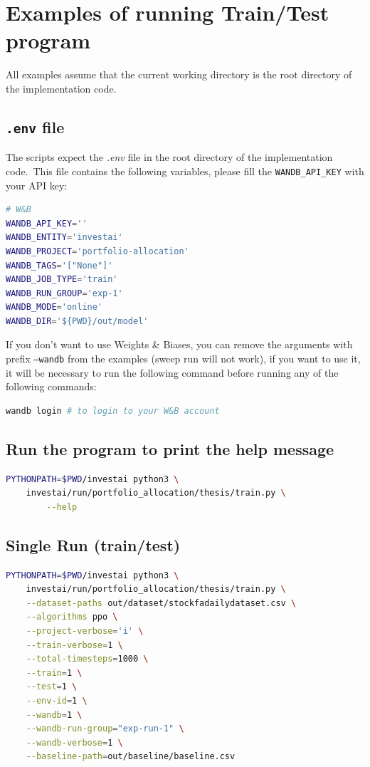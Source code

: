 \documentclass[../xlapes02]{subfiles}
\begin{document}
    \section{Examples of running Train/Test program}\label{sec:examples-of-running-train/test-program}
    All examples assume that the current working directory is the root directory of the implementation code.

    \subsection{\texttt{.env} file}\label{subsec:texttt{.env}-file}
    The scripts expect the \emph{.env} file in the root directory of the implementation code.\ This file contains the following variables, please fill the \texttt{WANDB\_API\_KEY} with your API key:
    \begin{lstlisting}[language=bash,label={lst:env-file}]
# W&B
WANDB_API_KEY=''
WANDB_ENTITY='investai'
WANDB_PROJECT='portfolio-allocation'
WANDB_TAGS='["None"]'
WANDB_JOB_TYPE='train'
WANDB_RUN_GROUP='exp-1'
WANDB_MODE='online'
WANDB_DIR='${PWD}/out/model'
    \end{lstlisting}
    If you don't want to use Weights \& Biases, you can remove the arguments with prefix \texttt{--wandb} from the examples (sweep run will not work), if you want to use it, it will be necessary to run the following command before running any of the following commands:
    \begin{lstlisting}[language=bash,label={lst:wandb-login}]
wandb login # to login to your W&B account
    \end{lstlisting}

    \subsection{Run the program to print the help message}\label{subsec:run-the-program-to-print-the-help-message}
    \begin{lstlisting}[language=bash,label={lst:help}]
PYTHONPATH=$PWD/investai python3 \
    investai/run/portfolio_allocation/thesis/train.py \
        --help
    \end{lstlisting}

    \subsection{Single Run (train/test)}\label{subsec:single-run-(train/test)}
    \begin{lstlisting}[language=bash,label={lst:run-train}]
PYTHONPATH=$PWD/investai python3 \
    investai/run/portfolio_allocation/thesis/train.py \
    --dataset-paths out/dataset/stockfadailydataset.csv \
    --algorithms ppo \
    --project-verbose='i' \
    --train-verbose=1 \
    --total-timesteps=1000 \
    --train=1 \
    --test=1 \
    --env-id=1 \
    --wandb=1 \
    --wandb-run-group="exp-run-1" \
    --wandb-verbose=1 \
    --baseline-path=out/baseline/baseline.csv
    \end{lstlisting}
\end{document}
